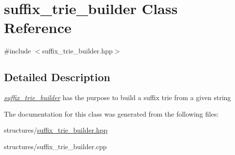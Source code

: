 \hypertarget{classsuffix__trie__builder}{\section{suffix\+\_\+trie\+\_\+builder Class Reference}
\label{classsuffix__trie__builder}
}


{\ttfamily \#include $<$suffix\+\_\+trie\+\_\+builder.\+hpp$>$}



\subsection{Detailed Description}
{\itshape \hyperlink{classsuffix__trie__builder}{suffix\+\_\+trie\+\_\+builder}} has the purpose to build a suffix trie from a given string 

The documentation for this class was generated from the following files\+:\begin{DoxyCompactItemize}
\item 
structures/\hyperlink{suffix__trie__builder_8hpp}{suffix\+\_\+trie\+\_\+builder.\+hpp}\item 
structures/suffix\+\_\+trie\+\_\+builder.\+cpp\end{DoxyCompactItemize}

